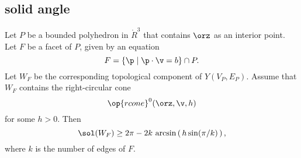 \subsection{solid angle}
%
%


\begin{lemma}[]\label{lemma:ngon} 
Let $P$ be a bounded polyhedron in $\ring{R}^3$ that contains $\orz$
as an interior point.  Let $F$ be a facet of $P$, given by an
equation
\begin{displaymath} 
F = \{\p \mid \p \cdot \v = b\} \cap P.
\end{displaymath} 
Let $W_F$ be the corresponding topological component of $Y(V_P,E_P)$.  
Assume that $W_F$ contains the right-circular cone 
\begin{displaymath} 
\op{rcone}^0(\orz,\v,h)
\end{displaymath}
for some $h>0$.
Then 
\begin{displaymath} 
\sol(W_F) \ge 
2\pi - 2 k \,\arcsin\left(\,h\sin(\pi/k)\,\right),
\end{displaymath}
where $k$ is the number of edges of $F$.
\end{lemma}

%

